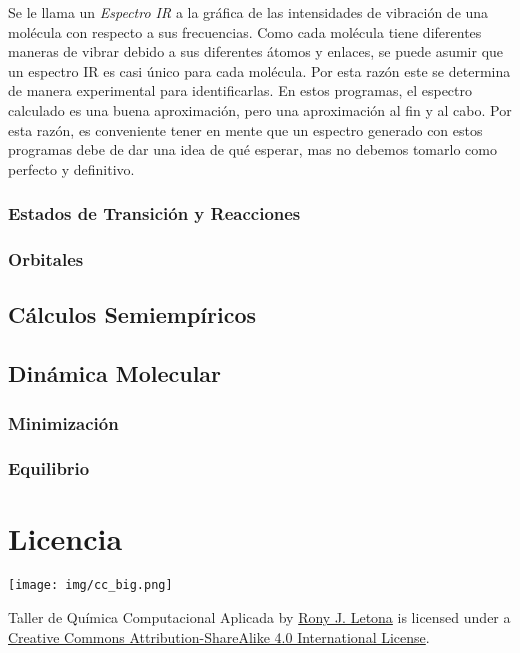 \documentclass[10pt,letterpaper]{article}
\begin{document}
Se le llama un \emph{Espectro IR} a la gr\'afica de las intensidades de vibraci\'on de una mol\'ecula con respecto a sus frecuencias. Como cada mol\'ecula tiene diferentes maneras de vibrar debido a sus diferentes \'atomos y enlaces, se puede asumir que un espectro IR es casi \'unico para cada mol\'ecula. Por esta raz\'on este se determina de manera experimental para identificarlas. En estos programas, el espectro calculado es  una buena aproximaci\'on, pero una aproximaci\'on al fin y al cabo. Por esta raz\'on, es conveniente tener en mente que un espectro generado con estos programas debe de dar una idea de qu\'e esperar, mas no debemos tomarlo como perfecto y definitivo.

\subsubsection{Estados de Transici\'on y Reacciones}



\subsubsection{Orbitales}

\subsection{C\'alculos Semiemp\'iricos}

\subsection{Din\'amica Molecular}

\subsubsection{Minimizaci\'on}

\subsubsection{Equilibrio}

\section*{Licencia}

\noindent \texttt{[image: img/cc\_big.png]}

\noindent Taller de Qu\'imica Computacional Aplicada by \href{http://github.com/zronyj/TQCA}{Rony J. Letona} is licensed under a \href{http://creativecommons.org/licenses/by-sa/4.0/}{Creative Commons Attribution-ShareAlike 4.0 International License}.
\end{document}
